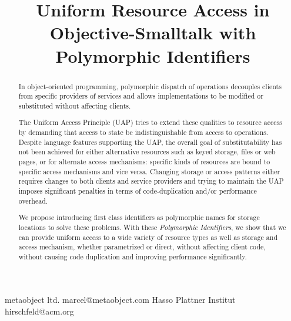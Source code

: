 \documentclass[preprint]{sigplanconf}
\begin{document}

\linespread{0.9}

\copyrightdata{[to be supplied]} 



\title{Uniform Resource Access in Objective-Smalltalk with Polymorphic Identifiers}



           {metaobject ltd.}
           {marcel@metaobject.com}
           {Hasso Plattner Institut}
           {hirschfeld@acm.org}


\maketitle

\begin{abstract}

In object-oriented programming, polymorphic dispatch of operations
decouples clients from specific providers of services and allows 
implementations to be modified or substituted without affecting clients. 

The Uniform Access Principle (UAP) tries to extend these qualities to 
resource access by demanding that access to state be indistinguishable
from access to operations.  Despite language features supporting the
UAP, the overall goal of substitutability has not been achieved for
either alternative resources such as keyed storage, files or web pages, or for alternate 
access mechanisms:    
specific kinds of resources are bound to specific access mechanisms and vice versa.
Changing storage or access patterns either requires changes to both clients and
service providers and trying to maintain the UAP imposes significant penalties in terms of
code-duplication and/or performance overhead.

We propose introducing first class identifiers as polymorphic names for storage locations
to solve these problems.  With these \emph{Polymorphic Identifiers}, we show that
we can provide uniform access to a wide variety of resource types as well as 
storage and access mechanism, whether parametrized or direct, without affecting
client code, without causing code duplication and improving performance significantly.

\end{abstract}
\end{document}
